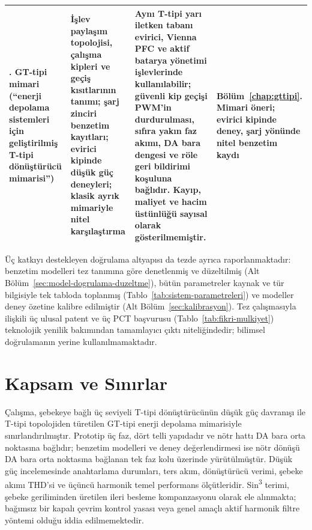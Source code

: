 \begin{table}[htbp]
\begin{tabularx}{\textwidth}{@{}>{\raggedright\arraybackslash}p{}>{\raggedright\arraybackslash}p{}>{\raggedright\arraybackslash}X>{\raggedright\arraybackslash}p{}@{}}
    \addlinespace
    3. GT-tipi mimari (``enerji depolama sistemleri için geliştirilmiş T-tipi dönüştürücü mimarisi'') &
    İşlev paylaşım topolojisi, çalışma kipleri ve geçiş kısıtlarının tanımı; şarj zinciri benzetim kayıtları; evirici kipinde düşük güç deneyleri; klasik ayrık mimariyle nitel karşılaştırma &
    Aynı T-tipi yarı iletken tabanı evirici, Vienna PFC ve aktif batarya yönetimi işlevlerinde kullanılabilir; güvenli kip geçişi PWM'in durdurulması, sıfıra yakın faz akımı, DA bara dengesi ve röle geri bildirimi koşuluna bağlıdır. Kayıp, maliyet ve hacim üstünlüğü sayısal olarak gösterilmemiştir. &
    Bölüm~\ref{chap:gttipi}. Mimari öneri; evirici kipinde deney, şarj yönünde nitel benzetim kaydı \\
    \bottomrule
  \end{tabularx}
\end{table}

Üç katkıyı destekleyen doğrulama altyapısı da tezde ayrıca raporlanmaktadır: benzetim modelleri tez tanımına göre denetlenmiş ve düzeltilmiş (Alt Bölüm~\ref{sec:model-dogrulama-duzeltme}), bütün parametreler kaynak ve tür bilgisiyle tek tabloda toplanmış (Tablo~\ref{tab:sistem-parametreleri}) ve modeller deney özetine kalibre edilmiştir (Alt Bölüm~\ref{sec:kalibrasyon}). Tez çalışmasıyla ilişkili üç ulusal patent ve üç PCT başvurusu (Tablo~\ref{tab:fikri-mulkiyet}) teknolojik yenilik bakımından tamamlayıcı çıktı niteliğindedir; bilimsel doğrulamanın yerine kullanılmamaktadır.

\section{Kapsam ve Sınırlar}
\label{sec:giris-kapsam}

Çalışma, şebekeye bağlı üç seviyeli T-tipi dönüştürücünün düşük güç davranışı ile T-tipi topolojiden türetilen GT-tipi enerji depolama mimarisiyle sınırlandırılmıştır. Prototip üç faz, dört telli yapıdadır ve nötr hattı DA bara orta noktasına bağlıdır; benzetim modelleri ve deney değerlendirmesi ise nötr dönüşü DA bara orta noktasına bağlanan tek faz kolu üzerinde yürütülmüştür. Düşük güç incelemesinde anahtarlama durumları, ters akım, dönüştürücü verimi, şebeke akımı THD'si ve üçüncü harmonik temel performans ölçütleridir. Sin\textsuperscript{3} terimi, şebeke geriliminden üretilen ileri besleme kompanzasyonu olarak ele alınmakta; bağımsız bir kapalı çevrim kontrol yasası veya genel amaçlı aktif harmonik filtre yöntemi olduğu iddia edilmemektedir.

